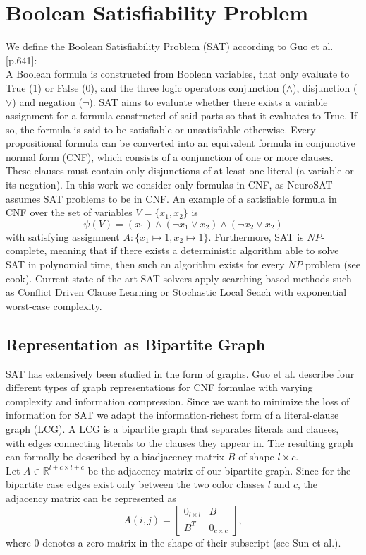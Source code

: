 \section{Boolean Satisfiability Problem}
We define the Boolean Satisfiability Problem (SAT) according to Guo et al.\cite{guo2023machine}[p.641]: \\
A Boolean formula is constructed from Boolean variables, that only evaluate to True (1) or False (0), and the three logic operators conjunction ($\wedge$), disjunction ($\vee$) and negation ($\neg$). SAT aims to evaluate whether there exists a variable assignment for a formula constructed of said parts so that it evaluates to True. If so, the formula is said to be satisfiable or unsatisfiable otherwise. Every propositional formula can be converted into an equivalent formula in conjunctive normal form (CNF), which consists of a conjunction of one or more clauses. These clauses must contain only disjunctions of at least one literal (a variable or its negation). In this work we consider only formulas in CNF, as NeuroSAT\cite{selsam2018learning} assumes SAT problems to be in CNF. An example of a satisfiable formula in CNF over the set of variables $V=\{x_1,x_2\}$ is 
$$\psi(V) = (x_1) \land (\neg x_1 \lor x_2) \land (\neg x_2 \lor x_2)$$
with satisfying assignment $A:\{x_1 \mapsto 1, x_2 \mapsto 1\}$. Furthermore, SAT is $NP$-complete, meaning that if there exists a deterministic algorithm able to solve SAT in polynomial time, then such an algorithm exists for every $NP$ problem (see cook\cite{cook2023complexity}). Current state-of-the-art SAT solvers apply searching based methods such as Conflict Driven Clause Learning\cite{marques1999grasp} or Stochastic Local Seach\cite{selman1993local} with exponential worst-case complexity.

\subsection{Representation as Bipartite Graph}
SAT has extensively been studied in the form of graphs. Guo et al.\cite{guo2023machine} describe four different types of graph representations for CNF formulae with varying complexity and information compression. Since we want to minimize the loss of information for SAT we adapt the information-richest form of a literal-clause graph (LCG). 
A LCG is a bipartite graph that separates literals and clauses, with edges connecting literals to the clauses they appear in.
The resulting graph can formally be described by a biadjacency matrix $B$ of shape $l \times c$. \\
Let $A \in \mathbb{R}^{l+c \times l+c}$ be the adjacency matrix of our bipartite graph. Since for the bipartite case edges exist only between the two color classes $l$ and $c$, the adjacency matrix can be represented as
\begin{equation}
    A(i,j) = \begin{bmatrix}
        0_{l \times l} & B \\
        B^T & 0_{c \times c}
    \end{bmatrix},
\end{equation}
where $0$ denotes a zero matrix in the shape of their subscript (see Sun et al.\cite{articleBiadjacency}). \bigskip

